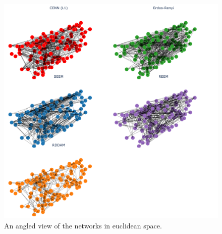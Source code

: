 \begin{figure}[h]
  \includegraphics[width=\linewidth]{../data/images/3D/all1.png}
  \caption{An angled view of the networks in euclidean space. }
\end{figure}